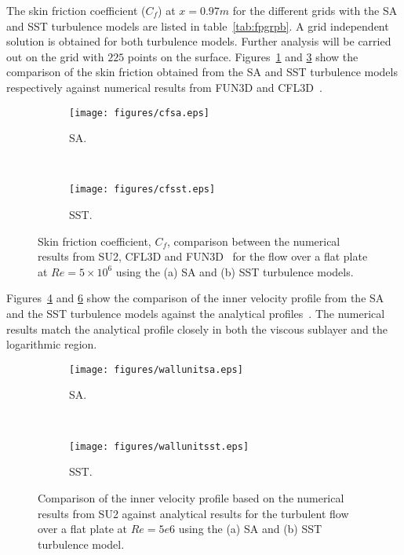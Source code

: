 The skin friction coefficient ($C_f$) at $x=0.97m$ for the different grids with the SA and SST turbulence models are listed in table~\ref{tab:fpgrpb}. A grid independent solution is obtained for both turbulence models. Further analysis will be carried out on the grid with $225$ points on the surface. Figures~\ref{fig:turbfpsacf} and \ref{fig:turbfpsstcf} show the comparison of the skin friction obtained from the SA and SST turbulence models respectively against numerical results from FUN3D and CFL3D~\cite{NASATMR}.
\begin{figure}[h!]
    \centering
    \captionsetup{justification=centering}
    \begin{subfigure}[b]{0.48\textwidth}
    \centering
    \captionsetup{justification=centering}
        \texttt{[image: figures/cfsa.eps]}
        \caption{SA.}
        \label{fig:turbfpsacf}
    \end{subfigure}
    ~ %
    \begin{subfigure}[b]{0.48\textwidth}
    \centering
    \captionsetup{justification=centering}
        \texttt{[image: figures/cfsst.eps]}
        \caption{SST.}
        \label{fig:turbfpsstcf}
    \end{subfigure}
    \caption{Skin friction coefficient, $C_f$, comparison between the numerical results from SU2, CFL3D and FUN3D~\cite{NASATMR} for the flow over a flat plate at $Re=5\times10^6$ using the (a) SA and (b) SST turbulence models.}
\end{figure}

Figures~\ref{fig:turbfpsaw} and \ref{fig:turbfpsstw} show the comparison of the inner velocity profile from the SA and the SST turbulence models against the analytical profiles~\cite{schlichting2016boundary}. The numerical results match the analytical profile closely in both the viscous sublayer and the logarithmic region. 
\begin{figure}[h!]
    \centering
    \captionsetup{justification=centering}
    \begin{subfigure}[b]{0.48\textwidth}
    \captionsetup{justification=centering}
        \texttt{[image: figures/wallunitsa.eps]}
        \caption{SA.}
        \label{fig:turbfpsaw}
    \end{subfigure}
    ~ %
    \begin{subfigure}[b]{0.48\textwidth}
    \captionsetup{justification=centering}
        \texttt{[image: figures/wallunitsst.eps]}
        \caption{SST.}
        \label{fig:turbfpsstw}
    \end{subfigure}
    \caption{Comparison of the inner velocity profile based on the numerical results from SU2 against analytical results for the turbulent flow over a flat plate at $Re=5e6$ using the (a) SA and (b) SST turbulence model.}
\end{figure}

